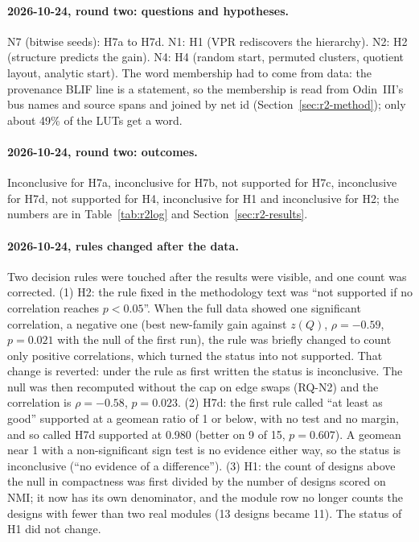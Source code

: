 \paragraph{2026-10-24, round two: questions and hypotheses.} N7 (bitwise seeds): H7a to H7d.
N1: H1 (VPR rediscovers the hierarchy). N2: H2 (structure predicts the gain). N4: H4 (random start,
permuted clusters, quotient layout, analytic start). The word membership had to come from data: the
provenance BLIF line is a statement, so the membership is read from Odin~III's bus names and source spans and
joined by net id (Section~\ref{sec:r2-method}); only about 49\%
of the LUTs get a word.

\paragraph{2026-10-24, round two: outcomes.} Inconclusive for H7a, inconclusive for H7b,
not supported for H7c, inconclusive for H7d, not supported for H4, inconclusive for H1 and inconclusive for H2;
the numbers are in Table~\ref{tab:r2log} and Section~\ref{sec:r2-results}.

\paragraph{2026-10-24, rules changed after the data.} Two decision rules were touched after the
results were visible, and one count was corrected. (1) H2: the rule fixed in the methodology text was ``not supported if no correlation reaches
$p<0.05$''. When the full data showed one significant correlation, a negative one (best new-family gain against $z(Q)$,
$\rho=-0.59$, $p=0.021$ with the null of the first run), the rule was briefly changed to count only positive correlations, which turned the status into
not supported. That change is reverted: under the rule as first written the status is inconclusive. The null was then recomputed without
the cap on edge swaps (RQ-N2) and the correlation is $\rho=-0.58$, $p=0.023$.
(2) H7d: the first rule called ``at least as good'' supported at a geomean ratio of 1 or below, with no test and no margin,
and so called H7d supported at 0.980 (better on 9 of 15, $p=0.607$). A geomean near
1 with a non-significant sign test is no evidence either way, so the status is inconclusive (``no evidence of a difference'').
(3) H1: the count of designs above the null in compactness was first divided by the number of designs scored on NMI; it now has its own
denominator, and the module row no longer counts the designs with fewer than two real modules (13 designs became 11). The status of H1 did
not change.

